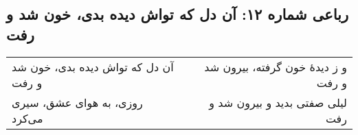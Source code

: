 \begin{center}
\section*{رباعی شماره ۱۲: آن دل که تواش دیده بدی، خون شد و رفت}
\label{sec:012}
\begin{longtable}{l p{0.5cm} r}
آن دل که تواش دیده بدی، خون شد و رفت
&&
و ز دیدهٔ خون گرفته، بیرون شد و رفت
\\
روزی، به هوای عشق، سیری می‌کرد
&&
لیلی صفتی بدید و بیرون شد و رفت
\\
\end{longtable}
\end{center}
